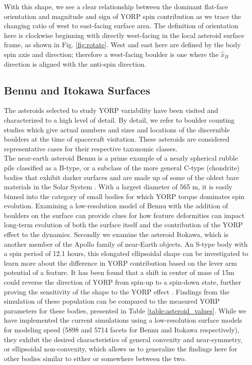 With this shape, we see a clear relationship between the dominant flat-face orientation and magnitude and sign of YORP spin contribution as we trace the changing ratio of west to east-facing surface area. The definition of orientation here is clockwise beginning with directly west-facing in the local asteroid surface frame, as shown in Fig. \ref{fig:rotate}. West and east here are defined by the body spin axis and direction; therefore a west-facing boulder is one where the $\hat{x}_B$ direction is aligned with the anti-spin direction. 

\subsection{Bennu and Itokawa Surfaces}

The asteroids selected to study YORP variability have been visited and characterized to a high level of detail. By detail, we refer to boulder counting studies which give actual numbers and sizes and locations of the discernible boulders at the time of spacecraft visitation. These asteroids are considered representative cases for their respective taxonomic classes. 
\\ \indent The near-earth asteroid Bennu is a prime example of a nearly spherical rubble pile classified as a B-type, or a subclass of the more general C-type (chondrite) bodies that exhibit darker surfaces and are made up of some of the oldest bare materials in the Solar System \citep{Lauretta2019}. With a largest diameter of 565 m, it is easily binned into the category of small bodies for which YORP torque dominates spin evolution. Examining a low-resolution model of Bennu with the addition of boulders on the surface can provide clues for how feature deformities can impact long-term evolution of both the surface itself and the contribution of the YORP effect to the dynamics. 
Secondly we examine the asteroid Itokawa, which is another member of the Apollo family of near-Earth objects. An S-type body with a spin period of 12.1 hours, this elongated ellipsoidal shape can be investigated to learn more about the difference in YORP contribution based on the lever arm potential of a feature. It has been found that a shift in center of mass of 15m could reverse the direction of YORP from spin-up to a spin-down state, further proving the sensitivity of the shape to the YORP effect \citep{Scheeres2008}.
Findings from the simulation of these population can be compared to the measured YORP parameters for these bodies, presented in Table \ref{table:asteroid_values}. While we have implemented the current simulations using a low-resolution surface models for modeling speed (5898 and 5714 facets for Bennu and Itokawa respectively), they exhibit the desired characteristics of general convexity and near-symmetry, or ellipsoidal non-convexity, which allows us to generalize the findings here for other bodies similar to either or somewhere between the two.
